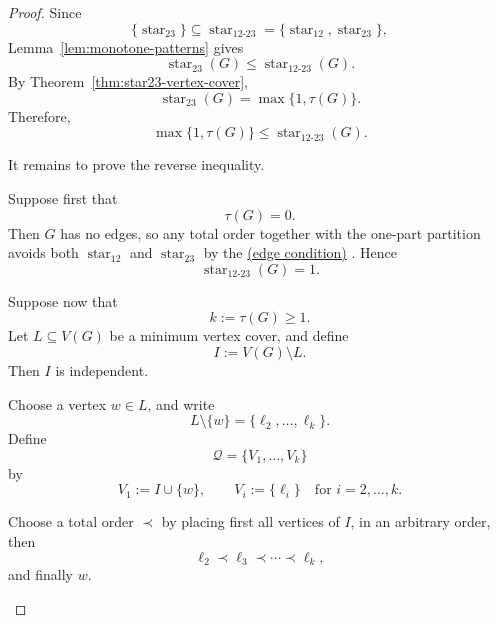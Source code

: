 \documentclass[12pt]{article}
\theoremstyle{plain}
\theoremstyle{definition}
\theoremstyle{remark}
\theoremstyle{definition}
\newcommand{\edgecondition}{%
  \hyperref[def:avoid:cond:edge]{(edge condition)}\xspace
}
\newcommand{\starlabel}{\mathrm{star}}
\DeclareRobustCommand{\starparam}[1]{%
  \ensuremath{\mathop{\starlabel}\nolimits_{#1}}%
}
\begin{document}
\begin{proof}
Since
\[
\{\starparam{23}\}
\subseteq
\starparam{12\text{-}23}
=
\{\starparam{12},\starparam{23}\},
\]
Lemma~\ref{lem:monotone-patterns} gives
\[
\starparam{23}(G)
\le
\starparam{12\text{-}23}(G).
\]
By Theorem~\ref{thm:star23-vertex-cover},
\[
\starparam{23}(G)=\max\{1,\tau(G)\}.
\]
Therefore,
\[
\max\{1,\tau(G)\}
\le
\starparam{12\text{-}23}(G).
\]

It remains to prove the reverse inequality.

Suppose first that
\[
\tau(G)=0.
\]
Then \(G\) has no edges, so any total order together with the one-part
partition avoids both \(\starparam{12}\) and \(\starparam{23}\) by the
\edgecondition{}. Hence
\[
\starparam{12\text{-}23}(G)=1.
\]

Suppose now that
\[
k:=\tau(G)\ge1.
\]
Let \(L\subseteq V(G)\) be a minimum vertex cover, and define
\[
I:=V(G)\setminus L.
\]
Then \(I\) is independent.

Choose a vertex \(w\in L\), and write
\[
L\setminus\{w\}
=
\{\ell_2,\dots,\ell_k\}.
\]
Define
\[
\mathcal Q=\{V_1,\dots,V_k\}
\]
by
\[
V_1:=I\cup\{w\},
\qquad
V_i:=\{\ell_i\}
\quad
\text{for }i=2,\dots,k.
\]

Choose a total order \(\prec\) by placing first all vertices of \(I\), in
an arbitrary order, then
\[
\ell_2\prec\ell_3\prec\cdots\prec\ell_k,
\]
and finally \(w\).




\begin{figure}[t]
\centering

\end{figure}
\end{proof}
\end{document}
